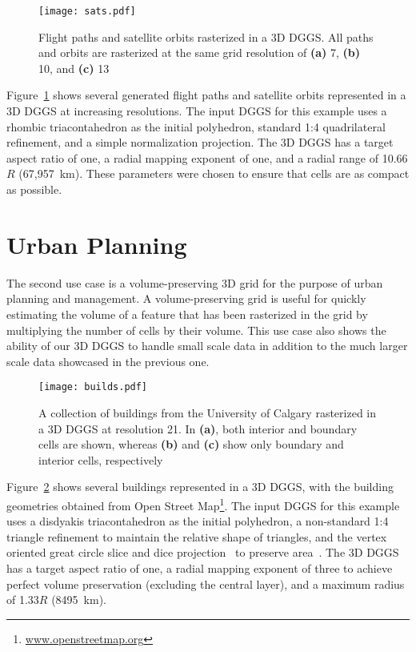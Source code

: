 \begin{figure}[h]
	\centering
	\texttt{[image: sats.pdf]}
	\caption{Flight paths and satellite orbits rasterized in a 3D DGGS.
		All paths and orbits are rasterized at the same grid resolution of \textbf{(a)} 7, \textbf{(b)} 10, and \textbf{(c)} 13}
	\label{fig:satellites}
\end{figure}


Figure~\ref{fig:satellites} shows several generated flight paths and satellite orbits represented in a 3D DGGS at increasing resolutions.
The input DGGS for this example uses a rhombic triacontahedron as the initial polyhedron, standard 1:4 quadrilateral refinement, and a simple normalization projection.
The 3D DGGS has a target aspect ratio of one, a radial mapping exponent of one, and a radial range of 10.66$R$ (67,957~km).
These parameters were chosen to ensure that cells are as compact as possible.

\section{Urban Planning}
The second use case is a volume-preserving 3D grid for the purpose of urban planning and management.
A volume-preserving grid is useful for quickly estimating the volume of a feature that has been rasterized in the grid by multiplying the number of cells by their volume.
This use case also shows the ability of our 3D DGGS to handle small scale data in addition to the much larger scale data showcased in the previous one.


\begin{figure}[h]
	\centering
	\texttt{[image: builds.pdf]}
	\caption{A collection of buildings from the University of Calgary rasterized in a 3D DGGS at resolution 21.
		In \textbf{(a)}, both interior and boundary cells are shown, whereas \textbf{(b)} and \textbf{(c)} show only boundary and interior cells, respectively}
	\label{fig:urbanplanning}
\end{figure}


Figure~\ref{fig:urbanplanning} shows several buildings represented in a 3D DGGS, with the building geometries obtained from Open Street Map\footnote{\url{www.openstreetmap.org}}.
The input DGGS for this example uses a disdyakis triacontahedron as the initial polyhedron, a non-standard 1:4 triangle refinement to maintain the relative shape of triangles, and the vertex oriented great circle slice and dice projection~\cite{van2006slice} to preserve area~\cite{hallDT}.
The 3D DGGS has a target aspect ratio of one, a radial mapping exponent of three to achieve perfect volume preservation (excluding the central layer), and a maximum radius of 1.33$R$ (8495~km).


